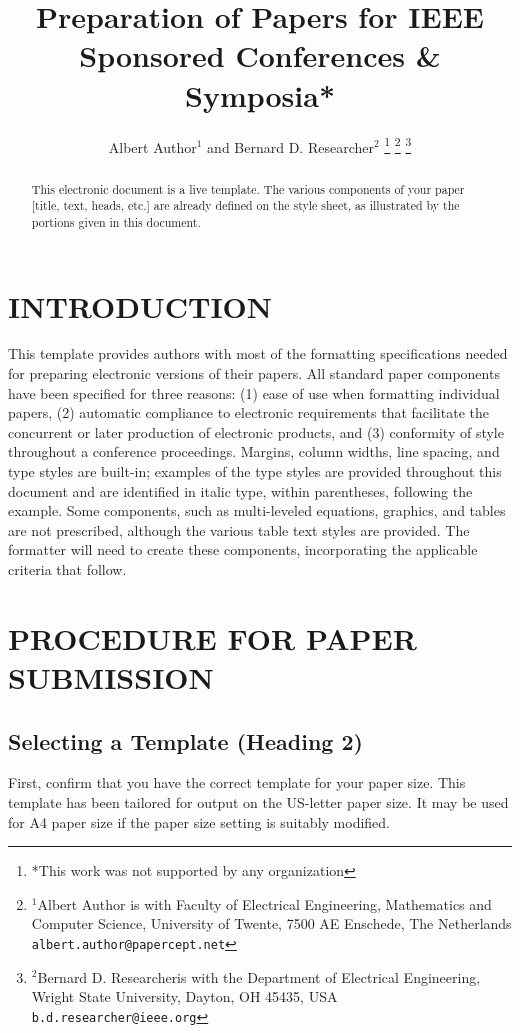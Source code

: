 \documentclass[a4paper, 10pt, conference]{ieeeconf}
\title{\LARGE \bf
Preparation of Papers for IEEE Sponsored Conferences \& Symposia*
}
\author{Albert Author$^{1}$ and Bernard D. Researcher$^{2}$%
\thanks{*This work was not supported by any organization}%
\thanks{$^{1}$Albert Author is with Faculty of Electrical Engineering, Mathematics and Computer Science,
University of Twente, 7500 AE Enschede, The Netherlands
{\tt\small albert.author@papercept.net}}%
\thanks{$^{2}$Bernard D. Researcheris with the Department of Electrical Engineering, Wright State University,
Dayton, OH 45435, USA
{\tt\small b.d.researcher@ieee.org}}%
}
\begin{document}
\maketitle
\thispagestyle{empty}
\pagestyle{empty}


\begin{abstract}

This electronic document is a live template. The various components of your paper [title, text, heads, etc.] are already defined on the style sheet, as illustrated by the portions given in this document.

\end{abstract}


\section{INTRODUCTION}

This template provides authors with most of the formatting specifications needed for preparing electronic versions of their papers. All standard paper components have been specified for three reasons: (1) ease of use when formatting individual papers, (2) automatic compliance to electronic requirements that facilitate the concurrent or later production of electronic products, and (3) conformity of style throughout a conference proceedings. Margins, column widths, line spacing, and type styles are built-in; examples of the type styles are provided throughout this document and are identified in italic type, within parentheses, following the example. Some components, such as multi-leveled equations, graphics, and tables are not prescribed, although the various table text styles are provided. The formatter will need to create these components, incorporating the applicable criteria that follow.

\section{PROCEDURE FOR PAPER SUBMISSION}

\subsection{Selecting a Template (Heading 2)}

First, confirm that you have the correct template for your paper size. This template has been tailored for output on the US-letter paper size. 
It may be used for A4 paper size if the paper size setting is suitably modified.
\end{document}
